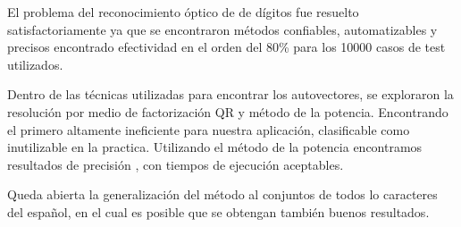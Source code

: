 El problema del reconocimiento óptico de de dígitos fue resuelto satisfactoriamente ya que se encontraron métodos 
confiables, automatizables y precisos encontrado efectividad en el orden del 80\% para los 10000 casos de test utilizados.

Dentro de las técnicas utilizadas para encontrar los autovectores, se exploraron la resolución por medio de factorización QR y 
método de la potencia. Encontrando el primero altamente ineficiente para nuestra aplicación, clasificable como inutilizable en la practica.
Utilizando el método de la potencia encontramos resultados de precisión , con tiempos de ejecución aceptables.

Queda abierta la generalización del método al conjuntos de todos lo caracteres del español, en el cual es posible que se obtengan también 
buenos resultados.


